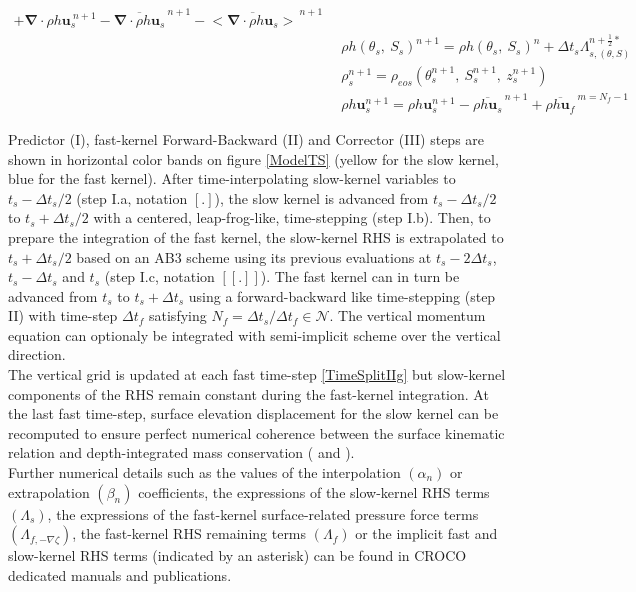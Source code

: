 \begin{table}
\begin{subequations}
\begin{alignat}{3}
 +\mathbf{\nabla}\cdot\rho h \mathbf{u}_s^{\ n+1}
 -\overline{\mathbf{\nabla}\cdot\rho h \mathbf{u}_s}^{\ n+1}
 -\overline{<\mathbf{\nabla}\cdot\rho h \mathbf{u}_s>}^{\ n+1}\\[2mm]
 \label{TimeSplitIIIb3}
 &\enspace\rho h(\theta_s,\ S_s)^{n+1}=
 \rho h(\theta_s,\ S_s)^{n}
 +\Delta t_s\Lambda_{s,(\theta,S)}^{n+\frac{1}{2}*}\\[0mm]
 \label{TimeSplitIIIb4}
 &\enspace\rho_s^{n+1}=\rho_{eos}\left(\theta_s^{n+1},\ S_s^{n+1},\ z_s^{n+1}\right)\\[0mm]
 \label{TimeSplitIIIb5}
 &\enspace\rho h\mathbf{u}_s^{n+1}=\rho h\mathbf{u}_s^{n+1}
 -\overline{\rho h\mathbf{u}_s}^{\ n+1}
 +\overline{\rho h\mathbf{u}_f}^{\ m=N_f-1}
\end{alignat}
\end{subequations}
\end{table}
Predictor (I), fast-kernel Forward-Backward (II) and Corrector (III) steps are shown in horizontal color bands on figure \ref{ModelTS} (yellow for the slow kernel, blue for the fast kernel). After time-interpolating slow-kernel variables to $t_s-\Delta t_s/2$ (step I.a, notation $[.]$), the slow kernel is advanced from $t_s-\Delta t_s/2$ to $t_s+\Delta t_s/2$ with a centered, leap-frog-like, time-stepping (step I.b). Then, to prepare the integration of the fast kernel, the slow-kernel RHS is extrapolated to $t_s+\Delta t_s/2$ based on an AB3 scheme using its previous evaluations at $t_s-2\Delta t_s$, $t_s-\Delta t_s$ and $t_s$ (step I.c, notation $[[.]]$). The fast kernel can in turn be advanced from $t_s$ to $t_s+\Delta t_s$ using a forward-backward like time-stepping (step II) with time-step $\Delta t_f$ satisfying  $N_f=\Delta t_s/\Delta t_f\in\mathcal{N}$. The vertical momentum equation can optionaly be integrated with semi-implicit scheme over the vertical direction.\\ 
The vertical grid is updated at each fast time-step \ref{TimeSplitIIg} but slow-kernel components of the RHS remain constant during the fast-kernel integration. At the last fast time-step, surface elevation displacement for the slow kernel can be recomputed to ensure perfect numerical coherence between the surface kinematic relation and depth-integrated mass conservation ( and ).\\
Further numerical details such as the values of the interpolation $(\alpha_n)$ or extrapolation $(\beta_n)$ coefficients, the expressions of the slow-kernel RHS terms $(\Lambda_s)$, the expressions of the fast-kernel surface-related pressure force terms $(\Lambda_{f,-\nabla\zeta})$,  the fast-kernel RHS remaining terms $(\Lambda_{f})$ or the implicit fast and slow-kernel RHS terms (indicated by an asterisk) can be found in CROCO dedicated manuals and publications.\\  
